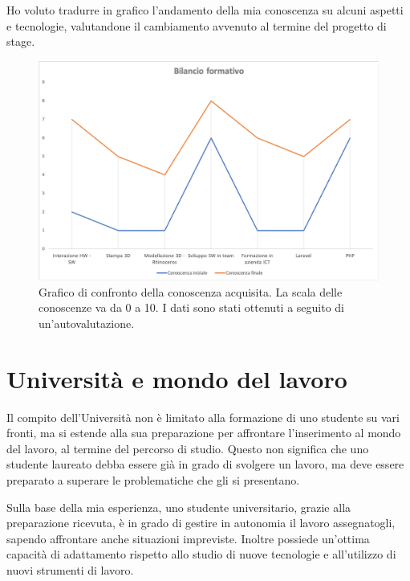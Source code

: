 Ho voluto tradurre in grafico l'andamento della mia conoscenza su alcuni aspetti e tecnologie, valutandone il cambiamento avvenuto al termine del progetto di stage.

\begin{figure}[H]
	\begin{center}
	\includegraphics[scale=0.49]{immagini/bilancio_formativo.png}
	\caption{Grafico di confronto della conoscenza acquisita. La scala delle conoscenze va da 0 a 10. I dati sono stati ottenuti a seguito di un'autovalutazione.}
	\end{center}
\end{figure}

\section{Università e mondo del lavoro}
Il compito dell'Università non è limitato alla formazione di uno studente su vari fronti, ma si estende alla sua preparazione per affrontare l'inserimento al mondo del lavoro, al termine del percorso di studio. Questo non significa che uno studente laureato debba essere già in grado di svolgere un lavoro, ma deve essere preparato a superare le problematiche che gli si presentano. 

\medskip

Sulla base della mia esperienza, uno studente universitario, grazie alla preparazione ricevuta, è in grado di  gestire in autonomia il lavoro assegnatogli, sapendo affrontare anche situazioni impreviste. Inoltre possiede un'ottima capacità di adattamento rispetto allo studio di nuove tecnologie e all'utilizzo di nuovi strumenti di lavoro.

\medskip

